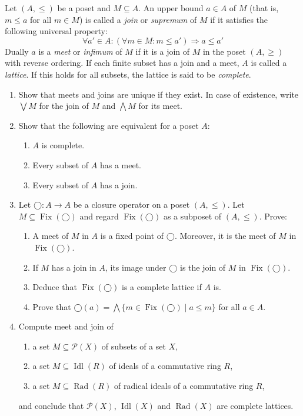 \documentclass{exercises}
\DeclareMathOperator{\Fix}{Fix}
\DeclareMathOperator{\Idl}{Idl}
\DeclareMathOperator{\Rad}{Rad}
\begin{document}
\begin{exercise}
  Let $(A,≤)$ be a poset and $M⊆A$.
  An upper bound $a ∈ A$ of $M$ (that is, $m ≤ a$ for all $m ∈ M$) is called a \emph{join} or \emph{supremum} of $M$ if it satisfies the following universal property:
  $$
  ∀a' ∈ A: (∀m ∈ M:m ≤ a') ⇒ a ≤ a'
  $$
  Dually $a$ is a \emph{meet} or \emph{infimum} of $M$ if it is a join of $M$ in the poset $(A,≥)$ with reverse ordering.
  If each finite subset has a join and a meet, $A$ is called a \emph{lattice}.
  If this holds for all subsets, the lattice is said to be \emph{complete}.

  \begin{enumerate}
    \item Show that meets and joins are unique if they exist.  In case of existence, write $⋁ M$ for the join of $M$ and $⋀ M$ for its meet.
    \item Show that the following are equivalent for a poset $A$:
      \begin{enumerate}
        \item $A$ is complete.
        \item Every subset of $A$ has a meet.
        \item Every subset of $A$ has a join.
      \end{enumerate}
    \item Let $◯:A → A$ be a closure operator on a poset $(A,≤)$.
    Let $M⊆\Fix(◯)$ and regard $\Fix(◯)$ as a subposet of $(A,≤)$.
      Prove:
      \begin{enumerate}
        \item A meet of $M$ in $A$ is a fixed point of $◯$.
          Moreover, it is the meet of $M$ in $\Fix(◯)$.
        \item If $M$ has a join in $A$, its image under $◯$ is the join of $M$ in $\Fix(◯)$.
        \item Deduce that $\Fix(◯)$ is a complete lattice if $A$ is.
        \item Prove that $◯(a) = ⋀ \{m ∈ \Fix(◯) \mid a ≤ m\}$ for all $a ∈ A$.
      \end{enumerate}
    \item Compute meet and join of
      \begin{enumerate}
        \item a set $M⊆𝒫(X)$ of subsets of a set $X$,
        \item a set $M⊆\Idl(R)$ of ideals of a commutative ring $R$,
        \item a set $M⊆\Rad(R)$ of radical ideals of a commutative ring $R$,
      \end{enumerate}
      and conclude that $𝒫(X)$, $\Idl(X)$ and $\Rad(X)$ are complete lattices.
  \end{enumerate}
\end{exercise}
\end{document}

